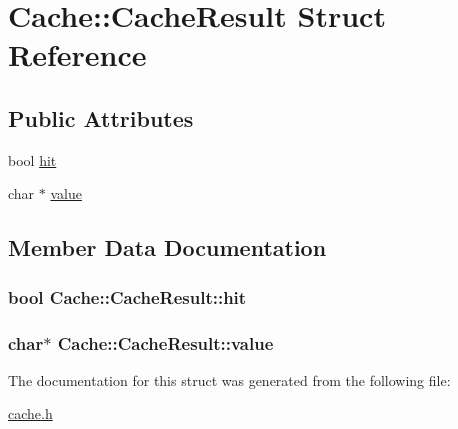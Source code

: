 \hypertarget{struct_cache_1_1_cache_result}{\section{Cache\-:\-:Cache\-Result Struct Reference}
\label{struct_cache_1_1_cache_result}
}
\subsection*{Public Attributes}
\begin{DoxyCompactItemize}
\item 
bool \hyperlink{struct_cache_1_1_cache_result_ac648fa31b3e1a1bbc4cc0e1c3db88c4e}{hit}
\item 
char $\ast$ \hyperlink{struct_cache_1_1_cache_result_a9de7ec9088ef43fe72d99aab4b6432ee}{value}
\end{DoxyCompactItemize}


\subsection{Member Data Documentation}
\hypertarget{struct_cache_1_1_cache_result_ac648fa31b3e1a1bbc4cc0e1c3db88c4e}{
\subsubsection[{hit}]{\setlength{\rightskip}{0pt plus 5cm}bool {\bf Cache\-::\-Cache\-Result\-::hit}}}\label{struct_cache_1_1_cache_result_ac648fa31b3e1a1bbc4cc0e1c3db88c4e}
\hypertarget{struct_cache_1_1_cache_result_a9de7ec9088ef43fe72d99aab4b6432ee}{
\subsubsection[{value}]{\setlength{\rightskip}{0pt plus 5cm}char$\ast$ {\bf Cache\-::\-Cache\-Result\-::value}}}\label{struct_cache_1_1_cache_result_a9de7ec9088ef43fe72d99aab4b6432ee}


The documentation for this struct was generated from the following file\-:\begin{DoxyCompactItemize}
\item 
\hyperlink{cache_8h}{cache.\-h}\end{DoxyCompactItemize}
